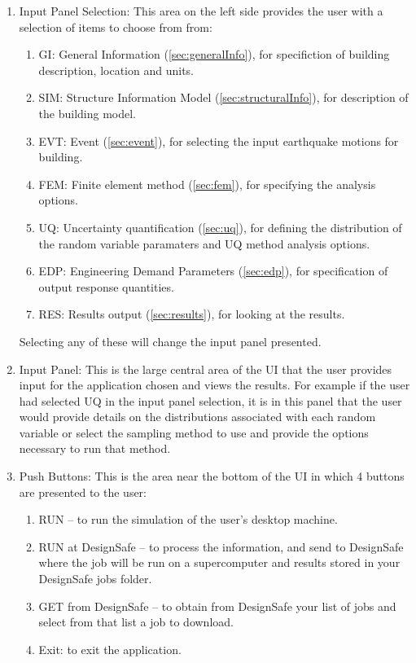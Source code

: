 \begin{enumerate}
\item Input Panel Selection: This area on the left side provides the
  user with a selection of items to choose from from:
\begin{enumerate}
  \item GI: General Information (\ref{sec:generalInfo}), for specifiction of building
    description, location and units.
  \item SIM: Structure Information Model (\ref{sec:structuralInfo}), for description of the
    building model.
  \item EVT: Event (\ref{sec:event}), for selecting the input earthquake motions for building.
  \item FEM: Finite element method (\ref{sec:fem}), for specifying the analysis options.
  \item UQ: Uncertainty quantification (\ref{sec:uq}), for defining the distribution
    of the random variable paramaters and UQ method analysis options.
  \item EDP: Engineering Demand Parameters (\ref{sec:edp}), for specification of
    output response quantities.
  \item RES: Results output (\ref{sec:results}), for looking at the results.
\end{enumerate}

Selecting any of these will change the input panel presented.

\item Input Panel: This is the large central area of the UI that the
  user provides input for the application chosen and views the
  results. For example if the user had selected UQ in the input panel
  selection, it is in this panel that the user would provide details
  on the distributions associated with each random variable or select
  the sampling method to use and provide the options necessary to run
  that method.

\item Push Buttons: This is the area near the bottom of the UI in
  which 4 buttons are presented to the user:

\begin{enumerate}
\item RUN – to run the simulation of the user’s desktop machine.
\item RUN at DesignSafe – to process the information, and send to
  DesignSafe where the job will be run on a supercomputer and results
  stored in your DesignSafe jobs folder.
\item GET from DesignSafe – to obtain from DesignSafe your list of
  jobs and select from that list a job to download.
\item Exit: to exit the application.
\end{enumerate}


\end{enumerate}
